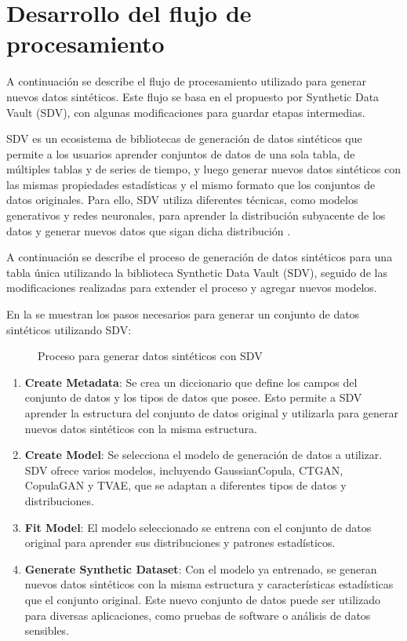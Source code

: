 \section{Desarrollo del flujo de procesamiento}
A continuación se describe el flujo de procesamiento utilizado para generar nuevos datos sintéticos. Este flujo se basa en el propuesto por Synthetic Data Vault (SDV), con algunas modificaciones para guardar etapas intermedias.

SDV es un ecosistema de bibliotecas de generación de datos sintéticos que permite a los usuarios aprender conjuntos de datos de una sola tabla, de múltiples tablas y de series de tiempo, y luego generar nuevos datos sintéticos con las mismas propiedades estadísticas y el mismo formato que los conjuntos de datos originales. Para ello, SDV utiliza diferentes técnicas, como modelos generativos y redes neuronales, para aprender la distribución subyacente de los datos y generar nuevos datos que sigan dicha distribución \cite{noauthor_overview_nodate, patki_synthetic_2016}.

A continuación se describe el proceso de generación de datos sintéticos para una tabla única utilizando la biblioteca Synthetic Data Vault (SDV), seguido de las modificaciones realizadas para extender el proceso y agregar nuevos modelos.


\newpage
En la  se muestran los pasos necesarios para generar un conjunto de datos sintéticos utilizando SDV:

\begin{figure}[H]
	\centering
	
	\caption{Proceso para generar datos sintéticos con SDV}
	\label{process-sdv}
\end{figure}

\begin{enumerate}
    \item \textbf{Create Metadata}: Se crea un diccionario que define los campos del conjunto de datos y los tipos de datos que posee. Esto permite a SDV aprender la estructura del conjunto de datos original y utilizarla para generar nuevos datos sintéticos con la misma estructura.
    \item \textbf{Create Model}: Se selecciona el modelo de generación de datos a utilizar. SDV ofrece varios modelos, incluyendo GaussianCopula, CTGAN, CopulaGAN y TVAE, que se adaptan a diferentes tipos de datos y distribuciones.
    \item \textbf{Fit Model}: El modelo seleccionado se entrena con el conjunto de datos original para aprender sus distribuciones y patrones estadísticos.
    \item \textbf{Generate Synthetic Dataset}: Con el modelo ya entrenado, se generan nuevos datos sintéticos con la misma estructura y características estadísticas que el conjunto original. Este nuevo conjunto de datos puede ser utilizado para diversas aplicaciones, como pruebas de software o análisis de datos sensibles.
\end{enumerate}

